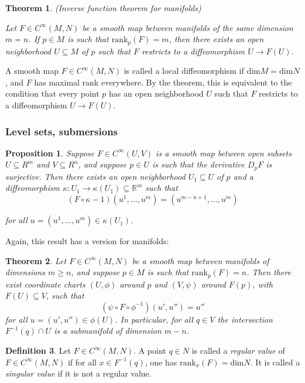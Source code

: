 \documentclass{article}
\newtheorem{theorem}{Theorem}[section]
\newtheorem{proposition}{Proposition}[theorem]
\theoremstyle{definition}
\newtheorem{defn}[theorem]{Definition}
\newenvironment{definition}
  {\vspace{8pt}\begin{mdframed}[backgroundcolor=blueish]\begin{defn}}
  {\end{defn}\end{mdframed}\vspace{4pt}}
\begin{document}
\begin{theorem} (Inverse function theorem for manifolds)

Let $F \in C^\infty(M,N)$ be a smooth map between manifolds of the same dimension $m = n$. If $p \in M$ is such that $\text{rank}_p(F) = m$, then there exists an open neighborhood $U \subseteq M$ of $p$ such that $F$ restricts to a diffeomorphism $U \rightarrow F(U)$.
\end{theorem}


A smooth map $F \in C^\infty(M,N)$ is called a local diffeomorphism if $\text{dim} M = \text{dim}N$, and $F$ has maximal rank everywhere. By the theorem, this is equivalent to the condition that every point $p$ has an open neighborhood $U$ such that $F$ restricts to a diffeomorphism $U \rightarrow F(U)$.

\subsubsection{Level sets, submersions}
\begin{proposition}
Suppose $F \in C^\infty(U,V)$ is a smooth map between open subsets $U \subseteq R^m$ and $V \subseteq R^n$, and suppose $p \in U$ is such that the derivative $D_p F$ is surjective. Then there exists an open neighborhood $U_1 \subseteq U$ of $p$ and a diffeomorphism $\kappa : U_1 \rightarrow \kappa (U_1) \subseteq \mathbb R^m$ such that
\[
   (F \circ \kappa - 1)(u^1, \dots, u^m) = (u^{m-n+1},\dots,u^m)
\]

for all $u = (u^1 ,\dots,u^m) \in \kappa(U_1)$.
\end{proposition}

Again, this result has a version for manifolds:

\begin{theorem}
Let $F \in C ^\infty(M,N)$ be a smooth map between manifolds of dimensions $m \geq n$, and suppose $p \in M$ is such that $\text{rank}_p(F) = n$. Then there exist coordinate charts $(U,\phi)$ around $p$ and $(V,\psi)$ around $F(p)$, with $F(U) \subseteq V$, such that 
\[
    (\psi \circ F \circ \phi^{-1} )(u' ,u'') = u'' 
\]
for all $u = (u',u'') \in \phi(U)$. In particular, for all $q \in V$ the intersection $F^{-1} (q)\cap U$ is a submanifold of dimension $m-n$.

\end{theorem}

\begin{definition}
    Let $F \in C^\infty(M,N)$. A point $q \in N$ is called a \textit{regular value} of $F \in C^\infty(M,N)$ if for all $x \in F^{-1} (q)$, one has $\text{rank}_x(F) = \text{dim}N$. It is called a \textit{singular value} if it is not a regular value.
\end{definition}
\end{document}

